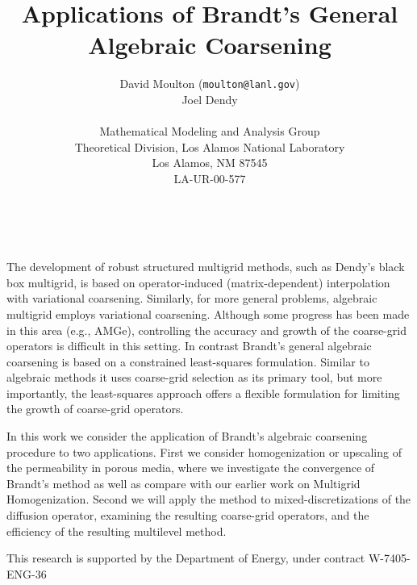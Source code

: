 \documentclass[11pt]{article}
\date{ ~ \hspace{-4mm}}
\title{Applications of Brandt's General Algebraic Coarsening  }
\author{David Moulton ({\tt moulton@lanl.gov}) \\ Joel Dendy \\ \\ Mathematical Modeling and Analysis Group  \\  Theoretical Division, Los Alamos National Laboratory  \\  Los Alamos, NM 87545  \\  LA-UR-00-577}
\begin{document}
\maketitle
\thispagestyle{empty}





 



    The development of robust structured multigrid methods, such as
Dendy's black box multigrid, is based on operator-induced
(matrix-dependent) interpolation with variational coarsening.
Similarly, for more general problems, algebraic multigrid employs
variational coarsening.  Although some progress has been made in this
area (e.g., AMGe), controlling the accuracy and growth of the
coarse-grid operators is difficult in this setting.  In contrast
Brandt's general algebraic coarsening is based on a constrained
least-squares formulation.  Similar to algebraic methods it uses
coarse-grid selection as its primary tool, but more importantly, the
least-squares approach offers a flexible formulation for limiting the
growth of coarse-grid operators.




   In this work we consider the application of Brandt's algebraic
coarsening procedure to two applications.  First we consider
homogenization or upscaling of the permeability in porous media, where
we investigate the convergence of Brandt's method as well as compare with
our earlier work on Multigrid Homogenization.  Second we will apply
the method to mixed-discretizations of the diffusion operator,
examining the resulting coarse-grid operators, and the efficiency of
the resulting multilevel method.




This research is supported by the Department of Energy,
  under contract W-7405-ENG-36
\end{document}
